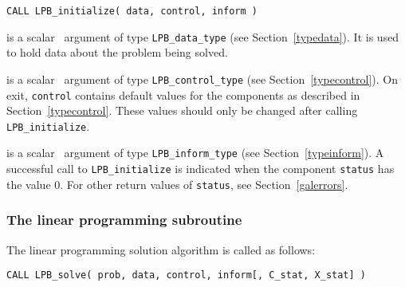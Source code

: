 \documentclass{galahad}
\newcommand{\packagename}{LPB}
\begin{document}
\hspace{8mm}
{\tt CALL \packagename\_initialize( data, control, inform )}

\vspace*{-3mm}
\begin{description}

 is a scalar \intentinout\ argument of type
{\tt \packagename\_data\_type}
(see Section~\ref{typedata}). It is used to hold data about the problem being
solved.

 is a scalar \intentout\ argument of type
{\tt \packagename\_control\_type}
(see Section~\ref{typecontrol}).
On exit, {\tt control} contains default values for the components as
described in Section~\ref{typecontrol}.
These values should only be changed after calling
{\tt \packagename\_initialize}.

 is a scalar \intentout\ argument of type
{\tt \packagename\_inform\_type}
(see Section~\ref{typeinform}). A successful call to
{\tt \packagename\_initialize}
is indicated when the  component {\tt status} has the value 0.
For other return values of {\tt status}, see Section~\ref{galerrors}.

\end{description}


\subsubsection{The linear programming subroutine}\label{qps}
The linear programming solution algorithm is called as follows:
\vspace*{1mm}

\hspace{8mm}
{\tt CALL \packagename\_solve( prob, data, control, inform[, C\_stat, X\_stat] )}
\end{document}
